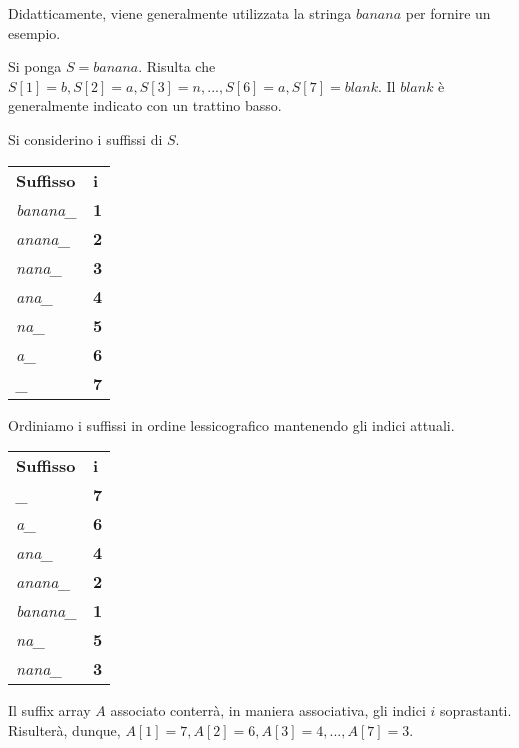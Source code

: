 Didatticamente, viene generalmente utilizzata la stringa $banana$ per fornire un esempio.

\vspace{3mm}

Si ponga $S=banana$. Risulta che $S[1]=b, S[2]=a, S[3]=n, ..., S[6]=a, S[7]=blank$. Il $blank$ è generalmente indicato con un trattino basso.

\vspace{3mm}

Si considerino i suffissi di $S$.

\begin{table}[H]
\centering
\begin{tabular}{ll}
\textbf{Suffisso} & \textbf{i} \\
\textit{banana\_} & \textbf{1} \\
\textit{anana\_}  & \textbf{2} \\
\textit{nana\_}   & \textbf{3} \\
\textit{ana\_}    & \textbf{4} \\
\textit{na\_}     & \textbf{5} \\
\textit{a\_}      & \textbf{6} \\
\textit{\_}       & \textbf{7}
\end{tabular}
\end{table}

Ordiniamo i suffissi in ordine lessicografico mantenendo gli indici attuali.

\begin{table}[H]
\centering
\begin{tabular}{ll}
\textbf{Suffisso} & \textbf{i} \\
\textit{\_}       & \textbf{7} \\
\textit{a\_}      & \textbf{6} \\
\textit{ana\_}    & \textbf{4} \\
\textit{anana\_}  & \textbf{2} \\
\textit{banana\_} & \textbf{1} \\
\textit{na\_}     & \textbf{5} \\
\textit{nana\_}   & \textbf{3}
\end{tabular}
\end{table}

Il suffix array $A$ associato conterrà, in maniera associativa, gli indici $i$ soprastanti. Risulterà, dunque, $A[1]=7, A[2]=6, A[3]=4, ..., A[7]=3$.

\vspace{3mm}


